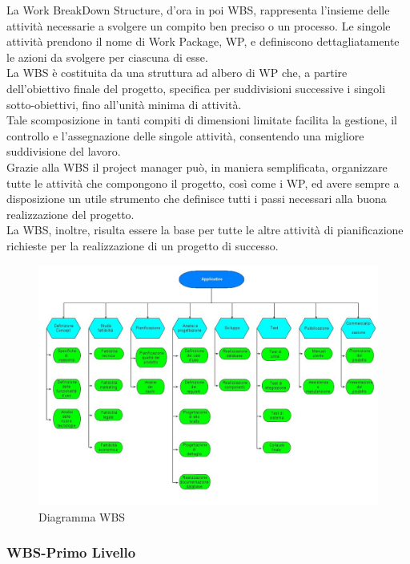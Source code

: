 La Work BreakDown Structure, d'ora in poi WBS, rappresenta l'insieme delle attivit\`{a} necessarie a svolgere un compito ben preciso o un processo. Le singole attivit\`{a} prendono il nome di Work Package, WP, e definiscono dettagliatamente le azioni da svolgere per ciascuna di esse.\\
La WBS \`{e} costituita da una struttura ad albero di WP che, a partire dell'obiettivo finale del progetto, specifica per suddivisioni successive i singoli sotto-obiettivi, fino all'unit\`{a} minima di attivit\`{a}.\\
Tale scomposizione in tanti compiti di dimensioni limitate facilita la gestione, il controllo e l'assegnazione delle singole attivit\`{a}, consentendo una migliore suddivisione del lavoro.\\
Grazie alla WBS il project manager pu\`{o}, in maniera semplificata, organizzare tutte le attivit\`{a} che compongono il progetto, cos\`{i} come i WP, ed avere sempre a disposizione un utile strumento che definisce tutti i passi necessari alla buona realizzazione del progetto.\\
La WBS, inoltre, risulta essere la base per tutte le altre attivit\`{a} di pianificazione richieste per la realizzazione di un progetto di successo.

\begin{figure}[H]
\centering %
\includegraphics[scale=0.5]{img/Progetto.jpg}
\caption{Diagramma WBS}
\label{fig:Diagramma WBS}
\end{figure}

\subsubsection{WBS-Primo Livello}
